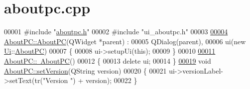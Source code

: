 \hypertarget{aboutpc_8cpp_source}{}\section{aboutpc.\+cpp}

\begin{DoxyCode}
00001 \textcolor{preprocessor}{#include "\hyperlink{aboutpc_8h}{aboutpc.h}"}
00002 \textcolor{preprocessor}{#include "ui\_aboutpc.h"}
00003 
\hypertarget{aboutpc_8cpp_source.tex_l00004}{}\hyperlink{class_about_p_c_a89341c4427d97da60acf15dc929ad8a6}{00004} \hyperlink{class_about_p_c_a89341c4427d97da60acf15dc929ad8a6}{AboutPC::AboutPC}(QWidget *parent) :
00005     QDialog(parent),
00006     ui(new \hyperlink{namespace_ui}{Ui}::\hyperlink{class_about_p_c}{AboutPC})
00007 \{
00008     ui->setupUi(\textcolor{keyword}{this});
00009 \}
00010 
\hypertarget{aboutpc_8cpp_source.tex_l00011}{}\hyperlink{class_about_p_c_a3cc0c4c81abc640d946003b078a47dd4}{00011} \hyperlink{class_about_p_c_a3cc0c4c81abc640d946003b078a47dd4}{AboutPC::~AboutPC}()
00012 \{
00013     \textcolor{keyword}{delete} ui;
00014 \}
\hypertarget{aboutpc_8cpp_source.tex_l00019}{}\hyperlink{class_about_p_c_aa3815d4826d0c8d87122449537a0a4d5}{00019} \textcolor{keywordtype}{void} \hyperlink{class_about_p_c_aa3815d4826d0c8d87122449537a0a4d5}{AboutPC::setVersion}(QString version)
00020 \{
00021     ui->versionLabel->setText(tr(\textcolor{stringliteral}{"Version "}) + version);
00022 \}
\end{DoxyCode}
